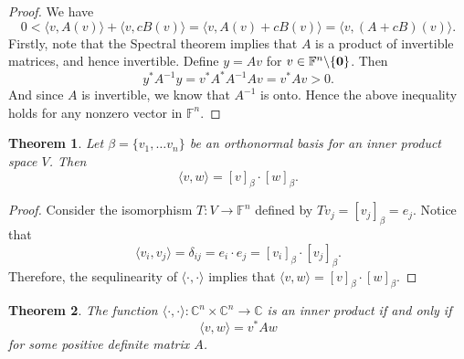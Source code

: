 \documentclass[oneside, 12pt]{book}
\newtheorem{thm}{Theorem}[section]
\theoremstyle{definition}
\begin{document}
\begin{proof}

We have \[0<\langle v , A(v) \rangle + \langle v, cB(v) \rangle = \langle v, A(v) + cB(v) \rangle = \langle v, (A+cB)(v) \rangle .\]
Firstly, note that the Spectral theorem implies that $A$ is a product of invertible matrices, and hence invertible. Define $y=Av$ for $v \in \mathbb{F}^{n} \backslash \{\bold{0}\}$. Then \[y^{*}A^{-1}y=v^{*}A^{*}A^{-1}Av=v^{*}Av>0.\] And since $A$ is invertible, we know that $A^{-1}$ is onto. Hence the above inequality holds for any nonzero vector in $\mathbb{F}^{n}$.
\end{proof}
\begin{thm}
  \label{thm_orthoinprod}
Let $\beta=\{v_{1}, \dots v_{n}\}$ be an orthonormal basis for an inner product space $V$. Then \[\langle v, w \rangle = [v]_{\beta} \cdot [w]_{\beta} .\]
\end{thm}
\begin{proof}
  \label{thm_innerproddot}
  Consider the isomorphism $T:V \to \mathbb{F}^{n}$ defined by $Tv_{j}=[v_{j}]_{\beta}=e_{j}$. Notice that \[\langle v_{i}, v_{j} \rangle= \delta_{ij}=e_{i} \cdot e_{j}=[v_{i}]_{\beta} \cdot [v_{j}]_{\beta}.\] Therefore, the sequlinearity of $\langle \cdot , \cdot \rangle$ implies that $\langle v , w \rangle= [v]_{\beta} \cdot [w]_{\beta}$.

\end{proof}
\begin{thm}
  \label{thm_definprod}
The function $\langle \cdot , \cdot \rangle: \mathbb{C}^{n} \times \mathbb{C}^{n} \to \mathbb{C}$ is an inner product if and only if \[\langle v , w \rangle=v^{*}Aw\] for some positive definite matrix $A$.
\end{thm}
\end{document}
